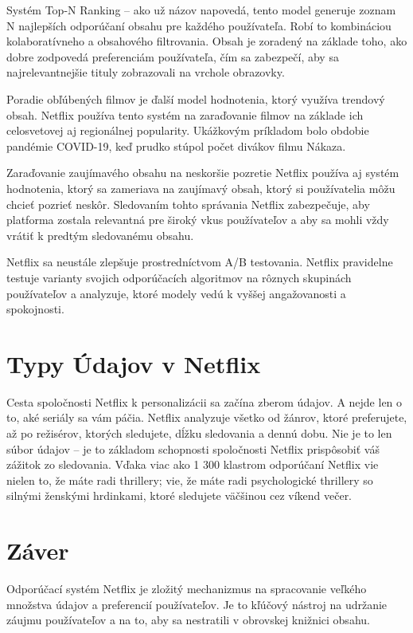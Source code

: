 \documentclass[10pt,slovak,a4paper]{article}
\begin{document}
Systém Top-N Ranking – ako už názov napovedá, tento model generuje zoznam N najlepších odporúčaní obsahu pre každého používateľa. Robí to kombináciou kolaboratívneho a obsahového filtrovania. Obsah je zoradený na základe toho, ako dobre zodpovedá preferenciám používateľa, čím sa zabezpečí, aby sa najrelevantnejšie tituly zobrazovali na vrchole obrazovky.\cite{Top}


Poradie obľúbených filmov je ďalší model hodnotenia, ktorý využíva trendový obsah. Netflix používa tento systém na zaraďovanie filmov na základe ich celosvetovej aj regionálnej popularity. Ukážkovým príkladom bolo obdobie pandémie COVID-19, keď prudko stúpol počet divákov filmu Nákaza.\cite{Top} 


Zaraďovanie zaujímavého obsahu na neskoršie pozretie
Netflix používa aj systém hodnotenia, ktorý sa zameriava na zaujímavý obsah, ktorý si používatelia môžu chcieť pozrieť neskôr. Sledovaním tohto správania Netflix zabezpečuje, aby platforma zostala relevantná pre široký vkus používateľov a aby sa mohli vždy vrátiť k predtým sledovanému obsahu.\cite{Top}\cite{Ranking:System}


Netflix sa neustále zlepšuje prostredníctvom A/B testovania. Netflix pravidelne testuje varianty svojich odporúčacích algoritmov na rôznych skupinách používateľov a analyzuje, ktoré modely vedú k vyššej angažovanosti a spokojnosti.\cite{Ranking:System}

\section{Typy Údajov v Netflix}
Cesta spoločnosti Netflix k personalizácii sa začína zberom údajov. A nejde len o to, aké seriály sa vám páčia. Netflix analyzuje všetko od žánrov, ktoré preferujete, až po režisérov, ktorých sledujete, dĺžku sledovania a dennú dobu. Nie je to len súbor údajov – je to základom schopnosti spoločnosti Netflix prispôsobiť váš zážitok zo sledovania. Vďaka viac ako 1 300 klastrom odporúčaní Netflix vie nielen to, že máte radi thrillery; vie, že máte radi psychologické thrillery so silnými ženskými hrdinkami, ktoré sledujete väčšinou cez víkend večer.\cite{Bennett}\cite{Data}

\section{Záver}
Odporúčací systém Netflix je zložitý mechanizmus na spracovanie veľkého množstva údajov a preferencií používateľov. Je to kľúčový nástroj na udržanie záujmu používateľov a na to, aby sa nestratili v obrovskej knižnici obsahu.


 
\end{document}
